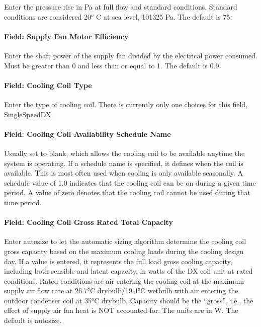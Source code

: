 Enter the pressure rise in Pa at full flow and standard conditions. Standard conditions are considered 20\(^{o}\) C at sea level, 101325 Pa. The default is 75.

\paragraph{Field: Supply Fan Motor Efficiency}\label{field-supply-fan-motor-efficiency-1}

Enter the shaft power of the supply fan divided by the electrical power consumed. Must be greater than 0 and less than or equal to 1. The default is 0.9.

\paragraph{Field: Cooling Coil Type}\label{field-cooling-coil-type-1}

Enter the type of cooling coil. There is currently only one choices for this field, SingleSpeedDX.

\paragraph{Field: Cooling Coil Availability Schedule Name}\label{field-cooling-coil-availability-schedule-name-1}

Usually set to blank, which allows the cooling coil to be available anytime the system is operating. If a schedule name is specified, it defines when the coil is available. This is most often used when cooling is only available seasonally. A schedule value of 1.0 indicates that the cooling coil can be on during a given time period. A value of zero denotes that the cooling coil cannot be used during that time period.

\paragraph{Field: Cooling Coil Gross Rated Total Capacity}\label{field-cooling-coil-gross-rated-total-capacity}

Enter autosize to let the automatic sizing algorithm determine the cooling coil gross capacity based on the maximum cooling loads during the cooling design day. If a value is entered, it represents the full load gross cooling capacity, including both sensible and latent capacity, in watts of the DX coil unit at rated conditions. Rated conditions are air entering the cooling coil at the maximum supply air flow rate at 26.7°C drybulb/19.4°C wetbulb with air entering the outdoor condenser coil at 35°C drybulb. Capacity should be the ``gross'', i.e., the effect of supply air fan heat is NOT accounted for. The units are in W. The default is autosize.

